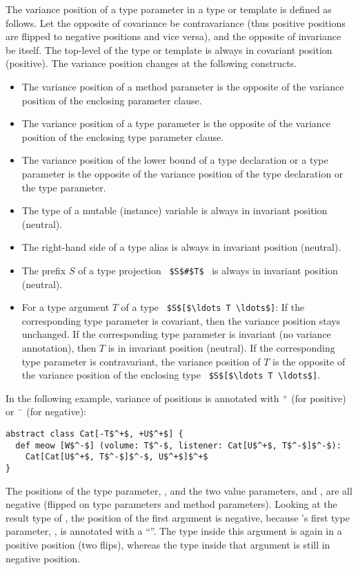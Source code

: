 The variance position of a type parameter in a type or template is defined as follows. Let the opposite of covariance be contravariance (thus positive positions are flipped to negative positions and vice versa), and the opposite of invariance be itself. The top-level of the type or template is always in covariant position (positive). The variance position changes at the following constructs. 
\begin{itemize}
\item The variance position of a method parameter is the opposite of the variance position of the enclosing parameter clause. 
\item The variance position of a type parameter is the opposite of the variance position of the enclosing type parameter clause. 
\item The variance position of the lower bound of a type declaration or a type parameter is the opposite of the variance position of the type declaration or the type parameter. 
\item The type of a mutable (instance) variable is always in invariant position (neutral). 
\item The right-hand side of a type alias is always in invariant position (neutral). 
\item The prefix $S$ of a type projection ~\lstinline!$S$#$T$!~ is always in invariant position (neutral). 
\item For a type argument $T$ of a type ~\lstinline!$S$[$\ldots T \ldots$]!: If the corresponding type parameter is covariant, then the variance position stays unchanged. If the corresponding type parameter is invariant (no variance annotation), then $T$ is in invariant position (neutral). If the corresponding type parameter is contravariant, the variance position of $T$ is the opposite of the variance position of the enclosing type ~\lstinline!$S$[$\ldots T \ldots$]!. 
\end{itemize}

\example In the following example, variance of positions is annotated with $^+$ (for positive) or $^-$ (for negative):
\begin{lstlisting}
abstract class Cat[-T$^+$, +U$^+$] {
  def meow [W$^-$] (volume: T$^-$, listener: Cat[U$^+$, T$^-$]$^-$):
    Cat[Cat[U$^+$, T$^-$]$^-$, U$^+$]$^+$
}
\end{lstlisting}
The positions of the type parameter, , and the two value parameters,  and , are all negative (flipped on type parameters and method parameters). Looking at the result type of , the position of the first  argument is negative, because 's first type parameter, , is annotated with a ``\code{-}''. The type  inside this argument is again in a positive position (two flips), whereas the type  inside that argument is still in negative position. 

